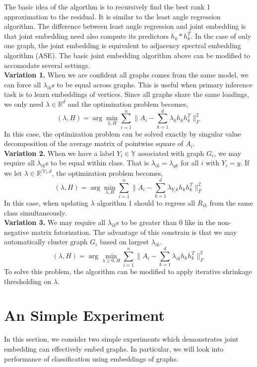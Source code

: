 \documentclass[a4paper]{article}
\begin{document}
\noindent The basic idea of the algorthm is to recursively find the best rank 1 approximation to the residual. It is similar to the least angle regression algorithm. The difference between least angle regression and joint embedding is that joint embedding need also compute its predictors $h_k*h_k^T$. In the case of only one graph, the joint embedding is equivalent to adjacency spectral embedding algorithm (ASE). The basic joint embedding algorithm above can be modified to accomodate several settings. \\
\textbf{Variation 1.} When we are confident all graphs comes from the same model, we can force all $\lambda_{ik}$s to be equal across graphs. This is useful when primary inference task is to learn embeddings of vertices. Since all graphs share the same loadings, we only need $\lambda \in \mathbb{R}^d$ and the optimization problem becomes,
\[ (\lambda,H) = \arg\min_{\lambda,H} \sum\limits_{i=1}^{n} \| A_i- \sum\limits_{k=1}^{d} \lambda_{k} h_k h_k^T \| _F ^2 \] 
In this case, the optimization problem can be solved exactly by singular value decomposition of the average matrix of pointwise square of $A_i$. \\
\textbf{Variation 2.} When we have a label $Y_i \in \mathbb{Y}$ associated with graph $G_i$, we may require all $\lambda_{ik}$s to be equal within class. That is $\lambda_{ik}=\lambda_{yk}$ for all $i$ with $Y_i=y$. If we let $\lambda \in \mathbb{R}^{|\mathbb{Y}|,d}$, the optimization problem becomes,
\[ (\lambda,H) = \arg\min_{\lambda,H} \sum\limits_{i=1}^{n} \| A_i- \sum\limits_{k=1}^{d} \lambda_{Y_ik} h_k h_k^T \| _F ^2 \] 
In this case, when updating $\lambda$ algorithm 1 should to regress all $R_{ik}$ from the same class simultaneously. \\
\textbf{Variation 3.} We may require all $\lambda_{ik}$s to be greater than $0$ like in the non-negative matrix fatorization. The advantage of this constrain is that we may automatically cluster graph $G_i$ based on largest $\lambda_{ik}$. 
\[ (\lambda,H) = \arg\min_{\lambda \geq 0,H} \sum\limits_{i=1}^{n} \| A_i- \sum\limits_{k=1}^{d} \lambda_{ik} h_k h_k^T \| _F ^2 \] 
To solve this problem, the algorithm can be modified to apply iterative shrinkage thresholding on $\lambda$. \\

\section{An Simple Experiment}
In this section, we consider two simple experiments which demonstrates joint embedding can effectively embed graphs. In particular, we will look into performance of classification using embeddings of graphs.
\end{document}
